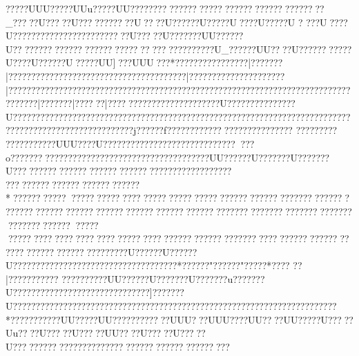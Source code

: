 {{{{{{{{{{{{{{{{{{{{{{{{{{{{{{{{{{{{{{{{{{{{{{{{{{{{{{{{{{{{{{{{{{{{{{{{{{{{{{{{{{{{{{{{{{{{{{{{{{{{{{{{{{{{{{{{{{{{{{{{{{{{{{{{{{{{{{{{{{{{{{{{{{{{{{{{{{{{{{{{{{{{{{{{{{{{{{{{{{{{{{{{{{{{{{{{{{{{{{{{{{{{{{{{{{{{{{{{{{{{{{{{{{{{{{{{{{{{{{{{{{{{{{{{{{{{{{{{{{{{{{{{{{{{{{{{{{{{{{{{{{{{{{{{{{{{{{{{{{{{{{{{{{{{{{{{{{{{{{{{{{{{{{{{{{{{{{{{{{{{{{{{{{{{{{{{{{{{{{{{{{{{{{{{{{{{{{{{{{{{{{{{{{{{{{{{{{{{{{{{{{{{{{{{{{{{{{{{{{{{{{{{{{{{{{{{{{{{{{{{{{{{{{{{{{{{{{{{{{{{{{{{{{{{{{{{{{{{{{{{{{{{{{{{{{{{{{{{{{{{{{{{{{{{{{{{{{{{{{{{{{{{{{{{{{{{{{{{{{{{{{{{{{{{{{{{{{{{{{{{{{{{{{{{{{{{{{{{{{{{{{{{{{{{{{{{{{{{{{{{{{{{{{{{{{{{{{{{{{{{{{{{? ????UUU?????UUu?????UU??????  ?????????????????????????????????_?????U?????U???????????U????U??????U?? ???U? ???U?? ???U ? ???U? ???U?? ?????? ?????  ?????  ?????  ??U?????U???????UU??????U}??????????????????????}??????????????????U_??????UU????U???????? ???U????U??????U?????UU]???UUU???*   ????   ?????  ?????  ??|???????|???{?????{???????{???????{?????{?????{???????|?????????{???????{?????|?????????????????{?????????????????????????????????????????????????????????????????|???????|??????|????????????????????????U???????????????U??????????????????????????????????????????????????????????????????????????????????????????????????????j??????f?????? ???????????? ?????  ????
  ????   ?????
???????????UUU????U????????????????????????????? ???o??????? ?????  ?????? ?????? ?????  ?????  ?????  ????UU??????U???????U???????U????????????????????????????????????????????? ???????????????????????????*?????? ????? ?????  ?????  ????   ?????  ?????  ?????  ?????? ?????? ????????????? ?????????????????????????????????????????????????????????????????????????????????????????
 ?????  ????  ????  ????  ????  ?????  ????  ?????? ?????? ??????????????????????????????????????????????????U??????U??????U?????{???????{?????????????{???????{????*??{????"??{????"??{???* ??{??
  ??|???????????
 ??????  ????UU??????U???????U???????u???????U??????????????????????????????]???????U???????????????????????????????????????????????????????????????????????* ?????? ?????UU?????UU?????  ?????  ??UUU???UUU????UU????UU?????U?????Uu????U?????U?????UU????U?????U?????U????????????????????????????????????????????
}}}}}}}}}}}}}}}}}}}}}}}}}}}}}}}}}}}}}}}}}}}}}}}}}}}}}}}}}}}}}}}}}}}}}}}}}}}}}}}}}}}}}}}}}}}}}}}}}}}}}}}}}}}}}}}}}}}}}}}}}}}}}}}}}}}}}}}}}}}}}}}}}}}}}}}}}}}}}}}}}}}}}}}}}}}}}}}}}}}}}}}}}}}}}}}}}}}}}}}}}}}}}}}}}}}}}}}}}}}}}}}}}}}}}}}}}}}}}}}}}}}}}}}}}}}}}}}}}}}}}}}}}}}}}}}}}}}}}}}}}}}}}}}}}}}}}}}}}}}}}}}}}}}}}}}}}}}}}}}}}}}}}}}}}}}}}}}}}}}}}}}}}}}}}}}}}}}}}}}}}}}}}}}}}}}}}}}}}}}}}}}}}}}}}}}}}}}}}}}}}}}}}}}}}}}}}}}}}}}}}}}}}}}}}}}}}}}}}}}}}}}}}}}}}}}}}}}}}}}}}}}}}}}}}}}}}}}}}}}}}}}}}}}}}}}}}}}}}}}}}}}}}}}}}}}}}}}}}}}}}}}}}}}}}}}}}}}}}}}}}}}}}}}}}}}}}}}}}}}}}}}}}}}}}}}}}}}}}}}}}}}}}}}}}}}}}}}}}}}}}}}}}}}}}}}}}}}}}}}}}}}}}}}}}}}}}}}}}}}
